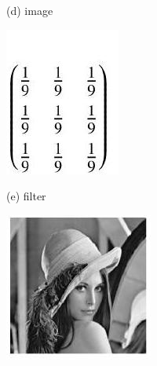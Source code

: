 \documentclass[10pt]{article}
\begin{document}
(d) image

\includegraphics[max width=\textwidth]{2022_01_06_b5ce182ed1bd5f482e5bg-19(4)}

(e) filter

\includegraphics[max width=\textwidth]{2022_01_06_b5ce182ed1bd5f482e5bg-19(5)}
\end{document}
